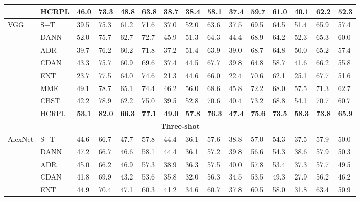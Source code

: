 \documentclass[a4paper,fleqn]{cas-dc}
\begin{document}
\begin{table}
\begin{tabular}{lllllllllllllll}
			~ & HCRPL & \textbf{46.0} & \textbf{73.3} & \textbf{48.8} & \textbf{63.8} & \textbf{38.7} & \textbf{38.4} & \textbf{58.1} & \textbf{37.4} & \textbf{59.7} & \textbf{61.0} & \textbf{40.1} & \textbf{62.2} & \textbf{52.3} \\
			\midrule
			\midrule
			\multirow{8}{*}{VGG} & S+T & 39.5 & 75.3 & 61.2 & 71.6 & 37.0 & 52.0 & 63.6 & 37.5 & 69.5 & 64.5 & 51.4 & 65.9 & 57.4 \\
			~ & DANN \cite{ganin2016domain} & 52.0 & 75.7 & 62.7 & 72.7 & 45.9 & 51.3 & 64.3 & 44.4 & 68.9 & 64.2 & 52.3 & 65.3 & 60.0 \\
			~ & ADR \cite{saito2017adversarial} & 39.7 & 76.2 & 60.2 & 71.8 & 37.2 & 51.4 & 63.9 & 39.0 & 68.7 & 64.8 & 50.0 & 65.2 & 57.4 \\
			~ & CDAN \cite{long2018conditional} & 43.3 & 75.7 & 60.9 & 69.6 & 37.4 & 44.5 & 67.7 & 39.8 & 64.8 & 58.7 & 41.6 & 66.2 & 55.8 \\
			~ & ENT \cite{grandvalet2005semi} & 23.7 & 77.5 & 64.0 & 74.6 & 21.3 & 44.6 & 66.0 & 22.4 & 70.6 & 62.1 & 25.1 & 67.7 & 51.6 \\
			~ & MME \cite{saito2019semi} & 49.1 & 78.7 & 65.1 & 74.4 & 46.2 & 56.0 & 68.6 & 45.8 & 72.2 & 68.0 & 57.5 & 71.3 & 62.7 \\
			~ & CBST \cite{zou2018domain} & 42.2 & 78.9 & 62.2 & 75.0 & 39.5 & 52.8 & 70.6 & 40.4 & 73.2 & 68.8 & 54.1 & 70.7 & 60.7 \\
			~ & HCRPL & \textbf{53.1} & \textbf{82.0} & \textbf{66.3} & \textbf{77.1} & \textbf{49.0} & \textbf{57.8} & \textbf{76.3} & \textbf{47.4} & \textbf{75.6} & \textbf{73.5} & \textbf{58.3} & \textbf{73.8} & \textbf{65.9} \\
			\midrule
			\multicolumn{15}{c}{\textbf{Three-shot}} \\
			\midrule
			\multirow{8}{*}{AlexNet} & S+T & 44.6 & 66.7 & 47.7 & 57.8 & 44.4 & 36.1 & 57.6 & 38.8 & 57.0 & 54.3 & 37.5 & 57.9 & 50.0 \\
			~ & DANN \cite{ganin2016domain} & 47.2 & 66.7 & 46.6 & 58.1 & 44.4 & 36.1 & 57.2 & 39.8 & 56.6 & 54.3 & 38.6 & 57.9 & 50.3 \\
			~ & ADR \cite{saito2017adversarial} & 45.0 & 66.2 & 46.9 & 57.3 & 38.9 & 36.3 & 57.5 & 40.0 & 57.8 & 53.4 & 37.3 & 57.7 & 49.5 \\
			~ & CDAN \cite{long2018conditional} & 41.8 & 69.9 & 43.2 & 53.6 & 35.8 & 32.0 & 56.3 & 34.5 & 53.5 & 49.3 & 27.9 & 56.2 & 46.2 \\
			~ & ENT \cite{grandvalet2005semi} & 44.9 & 70.4 & 47.1 & 60.3 & 41.2 & 34.6 & 60.7 & 37.8 & 60.5 & 58.0 & 31.8 & 63.4 & 50.9 \\

\end{tabular}
\end{table}
\end{document}

